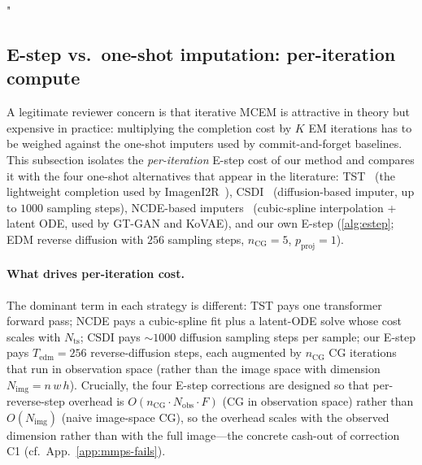"\documentclass{article}
\theoremstyle{plain}
\theoremstyle{definition}
\theoremstyle{remark}
\newcommand{\Nts}{N_{\mathrm{ts}}}
\newcommand{\Nimg}{N_{\mathrm{img}}}
\newcommand{\Nobs}{N_{\mathrm{obs}}}
\begin{document}
\subsection{E-step vs.\ one-shot imputation: per-iteration compute}
\label{app:completion-compute}

A legitimate reviewer concern is that iterative MCEM is attractive in theory but expensive in practice: multiplying the completion cost by $K$ EM iterations has to be weighed against the one-shot imputers used by commit-and-forget baselines. This subsection isolates the \emph{per-iteration} E-step cost of our method and compares it with the four one-shot alternatives that appear in the literature: TST~\citep{zerveas2021transformer} (the lightweight completion used by ImagenI2R~\citep{fadlon2025imageni2r}), CSDI~\citep{tashiro2021csdi} (diffusion-based imputer, up to $1000$ sampling steps), NCDE-based imputers~\citep{kidger2020neural} (cubic-spline interpolation + latent ODE, used by GT-GAN and KoVAE), and our own E-step (\cref{alg:estep}; EDM reverse diffusion with $256$ sampling steps, $n_{\mathrm{CG}}=5$, $p_{\mathrm{proj}}=1$).

\paragraph{What drives per-iteration cost.}
The dominant term in each strategy is different: TST pays one transformer forward pass; NCDE pays a cubic-spline fit plus a latent-ODE solve whose cost scales with $\Nts$; CSDI pays $\sim 1000$ diffusion sampling steps per sample; our E-step pays $T_{\mathrm{edm}}=256$ reverse-diffusion steps, each augmented by $n_{\mathrm{CG}}$ CG iterations that run in observation space (rather than the image space with dimension $\Nimg = n\,w\,h$). Crucially, the four E-step corrections are designed so that per-reverse-step overhead is $O(n_{\mathrm{CG}} \cdot \Nobs \cdot F)$ (CG in observation space) rather than $O(\Nimg)$ (naive image-space CG), so the overhead scales with the observed dimension rather than with the full image---the concrete cash-out of correction C1 (cf.\ App.~\ref{app:mmps-fails}).
\end{document}
